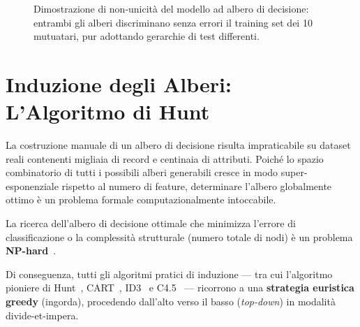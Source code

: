 \begin{figure}[H]
{%
}
\caption{Dimostrazione di non-unicità del modello ad albero di decisione: entrambi gli alberi discriminano senza errori il training set dei 10 mutuatari, pur adottando gerarchie di test differenti.}
\label{fig:dm-two-equivalent-trees}
\end{figure}

\FloatBarrier
\section{Induzione degli Alberi: L'Algoritmo di Hunt}
\label{sec:dm-hunt-algorithm}

La costruzione manuale di un albero di decisione risulta impraticabile su dataset reali contenenti migliaia di record e centinaia di attributi. Poiché lo spazio combinatorio di tutti i possibili alberi generabili cresce in modo super-esponenziale rispetto al numero di feature, determinare l'albero globalmente ottimo è un problema formale computazionalmente intoccabile.

\begin{theorem}
La ricerca dell'albero di decisione ottimale che minimizza l'errore di classificazione o la complessità strutturale (numero totale di nodi) è un problema \textbf{NP-hard}~\cite{breiman1984}.
\end{theorem}

Di conseguenza, tutti gli algoritmi pratici di induzione --- tra cui l'algoritmo pioniere di Hunt~\cite{hunt1966}, CART~\cite{breiman1984}, ID3~\cite{quinlan1986} e C4.5~\cite{quinlan1993} --- ricorrono a una \textbf{strategia euristica greedy} (ingorda), procedendo dall'alto verso il basso (\textit{top-down}) in modalità divide-et-impera.

